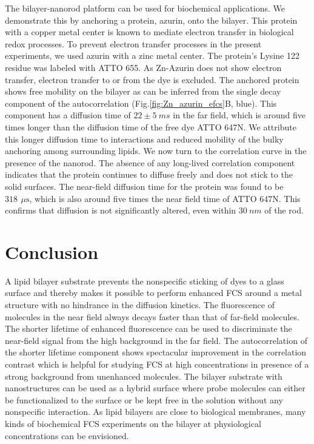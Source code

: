 \documentclass[journal=jpccck,manuscript=article]{achemso}
\newcommand{\us}{\ensuremath{\,\mu\textrm{s}}}
\begin{document}
The bilayer-nanorod platform can be used for biochemical applications. We demonstrate this by anchoring a protein, 
azurin, onto the bilayer. This protein with a copper metal center is known to mediate electron transfer in biological 
redox processes.\cite{kolczak2006azurin,Vijgenboom1997invivo} To prevent electron transfer processes in the present 
experiments, we used azurin with a zinc metal center. The protein's Lysine 122 residue was labeled with ATTO 655. 
As Zn-Azurin does not show electron transfer, electron transfer to or from the dye is excluded. The anchored protein 
shows free mobility on the bilayer as can be inferred from the single decay component of the 
autocorrelation (Fig.\ref{fig:Zn_azurin_efcs}B, blue). This component has a diffusion time of $22\pm5~ms$ in the 
far field, which is around five times longer than the diffusion time of the free dye ATTO 647N. We attribute this 
longer diffusion time to interactions and reduced mobility of the bulky anchoring among surrounding lipids. 
We now turn to the correlation curve in the presence of the nanorod. The absence of any long-lived correlation 
component indicates that the protein continues to diffuse freely and does not stick to the solid surfaces. 
The near-field diffusion time for the protein was found to be $318~\us$, which is also around five times the 
near field time of ATTO 647N. This confirms that diffusion is not significantly altered, even within $30~nm$ 
of the rod.\\
\section{Conclusion}
A lipid bilayer substrate prevents the nonspecific sticking of dyes to a glass surface and thereby makes it possible 
to perform enhanced FCS around a metal structure with no hindrance in the diffusion kinetics. The fluorescence of 
molecules in the near field always decays faster than that of far-field molecules. The shorter lifetime of enhanced 
fluorescence can be used to discriminate the near-field signal from the high background in the far field. 
The autocorrelation of the shorter lifetime component shows spectacular improvement in the correlation contrast 
which is helpful for studying FCS at high concentrations in presence of a strong background from unenhanced molecules. 
The bilayer substrate with nanostructures can be used as a hybrid surface where probe molecules can either be 
functionalized to the surface or be kept free in the solution without any nonspecific interaction. As lipid 
bilayers are close to biological membranes, many kinds of biochemical FCS experiments on the bilayer at physiological 
concentrations can be envisioned.\\
\end{document}
